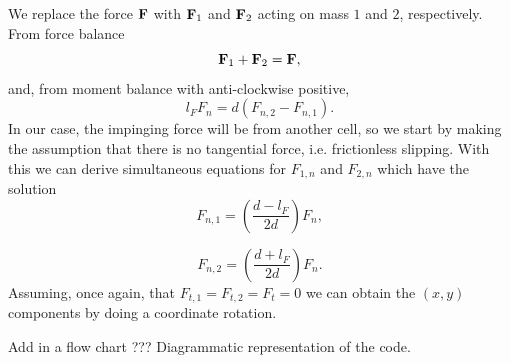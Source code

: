 We replace the force $\vb{F}$ with $\vb{F}_1$ and $\vb{F}_2$ acting on mass $1$ and $2$, respectively. From force balance
\begin{equation*}
 \vb{F}_1+  \vb{F}_2 = \vb{F}, 
\end{equation*}
and, from moment balance with anti-clockwise positive,
\begin{equation*}
 l_F F_n = d(F_{n,2} - F_{n,1}).
\end{equation*}
In our case, the impinging force will be from another cell, so we start by making the assumption that there is no tangential force, i.e. frictionless slipping. With this we can
derive simultaneous equations for $F_{1,n}$ and $F_{2,n}$ which have the solution
\begin{equation*}
    F_{n,1} =  \left( \frac{d-l_F}{2d} \right) F_n,
\end{equation*}

\begin{equation*}
    F_{n,2} =  \left( \frac{d+l_F}{2d} \right) F_n.
\end{equation*}
Assuming, once again, that $F_{t,1} = F_{t,2} = F_t = 0$ we can obtain the $(x,y)$ components by doing a coordinate rotation.

Add in a flow chart ??? Diagrammatic representation of the code. 









